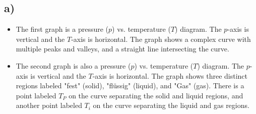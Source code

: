

\subsection*{a)}

\begin{itemize}
    \item The first graph is a pressure ($p$) vs. temperature ($T$) diagram. The $p$-axis is vertical and the $T$-axis is horizontal. The graph shows a complex curve with multiple peaks and valleys, and a straight line intersecting the curve.
    \item The second graph is also a pressure ($p$) vs. temperature ($T$) diagram. The $p$-axis is vertical and the $T$-axis is horizontal. The graph shows three distinct regions labeled "fest" (solid), "flüssig" (liquid), and "Gas" (gas). There is a point labeled $T_P$ on the curve separating the solid and liquid regions, and another point labeled $T_i$ on the curve separating the liquid and gas regions.
\end{itemize}